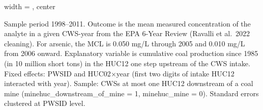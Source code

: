 \begin{table}[htbp]
\begin{adjustbox}{width = \textwidth, center}
      
      
   \end{adjustbox}
      {\tiny\linespread{1}\selectfont \par \raggedright 
   Sample period 1998--2011. Outcome is the mean measured concentration of the analyte in a given CWS-year from the EPA 6-Year Review (Ravalli et al.~2022 cleaning). For arsenic, the MCL is 0.050 mg/L through 2005 and 0.010 mg/L from 2006 onward. Explanatory variable is cumulative coal production since 1985 (in 10 million short tons) in the HUC12 one step upstream of the CWS intake. Fixed effects: PWSID and HUC02$\times$year (first two digits of intake HUC12 interacted with year). Sample: CWSs at most one HUC12 downstream of a coal mine (minehuc\_downstream\_of\_mine = 1, minehuc\_mine = 0). Standard errors clustered at PWSID level.}
   
\end{table}


